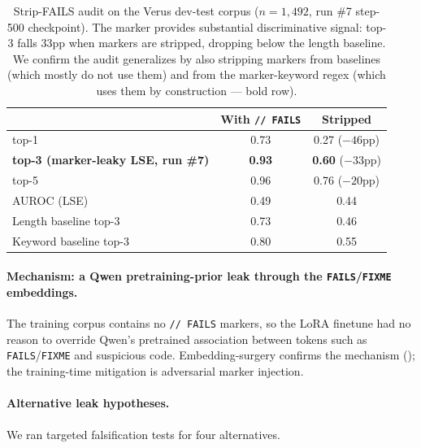 \documentclass[10pt]{article}
\begin{document}
\begin{table}[htbp]
\centering
\caption{Strip-FAILS audit on the Verus dev-test corpus
($n{=}1{,}492$, run \#7 step-500 checkpoint). The marker provides
substantial discriminative signal: top-3 falls $33$pp when markers are
stripped, dropping below the length baseline. We confirm the audit
generalizes by also stripping markers from baselines (which mostly do
not use them) and from the marker-keyword regex (which uses them by
construction --- bold row).}
\label{tab:strip-fails-headline}
\small
\begin{tabular}{lcc}
\toprule
                                & With \texttt{// FAILS}  & Stripped                \\
\midrule
top-1                           & 0.73                    & 0.27 ($-46$pp)          \\
\textbf{top-3 (marker-leaky LSE, run \#7)}  & \textbf{0.93}           & \textbf{0.60} ($-33$pp) \\
top-5                           & 0.96                    & 0.76 ($-20$pp)          \\
AUROC (LSE)                     & 0.49                    & 0.44                    \\
\midrule
Length baseline top-3           & 0.73                    & 0.46                    \\
Keyword baseline top-3          & 0.80                    & 0.55                    \\
\bottomrule
\end{tabular}
\end{table}

\paragraph{Mechanism: a Qwen pretraining-prior leak through the
\texttt{FAILS}/\texttt{FIXME} embeddings.}
The training corpus contains no \texttt{// FAILS} markers, so the LoRA
finetune had no reason to override Qwen's pretrained association between
tokens such as \texttt{FAILS}/\texttt{FIXME} and suspicious code.
Embedding-surgery confirms the mechanism (); the
training-time mitigation is adversarial marker injection.

\paragraph{Alternative leak hypotheses.}
We ran targeted falsification tests for four alternatives.
\end{document}
